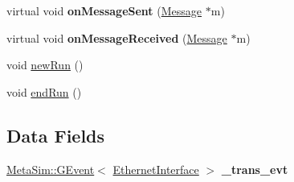 \begin{DoxyCompactItemize}
\item 
virtual void {\bfseries on\+Message\+Sent} (\hyperlink{classMessage}{Message} $\ast$m)\hypertarget{classEthernetInterface_af1d5ae0b6baf2f10ebda232c88876772}{}\label{classEthernetInterface_af1d5ae0b6baf2f10ebda232c88876772}

\item 
virtual void {\bfseries on\+Message\+Received} (\hyperlink{classMessage}{Message} $\ast$m)\hypertarget{classEthernetInterface_ae287765483436ad2e3970ac0a4560016}{}\label{classEthernetInterface_ae287765483436ad2e3970ac0a4560016}

\item 
void \hyperlink{classEthernetInterface_a484a93873c9151b62b0c909283b64f16}{new\+Run} ()
\item 
void \hyperlink{classEthernetInterface_a9b7f49cd7f8cbcf78ed4fd601c486a6c}{end\+Run} ()
\end{DoxyCompactItemize}
\subsection*{Data Fields}
\begin{DoxyCompactItemize}
\item 
\hyperlink{classMetaSim_1_1GEvent}{Meta\+Sim\+::\+G\+Event}$<$ \hyperlink{classEthernetInterface}{Ethernet\+Interface} $>$ {\bfseries \+\_\+trans\+\_\+evt}\hypertarget{classEthernetInterface_ad0b70e92e5525f38f37d2ea31120dbd7}{}\label{classEthernetInterface_ad0b70e92e5525f38f37d2ea31120dbd7}

\end{DoxyCompactItemize}
